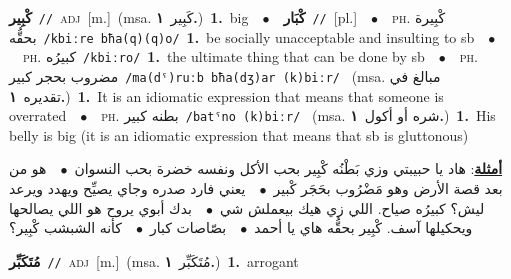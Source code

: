 \documentclass[10pt,a4paper,twoside]{article} %
\begin{document}
\begin{multicols}{2}
{\setlength\topsep{0pt}\textbf{\foreignlanguage{arabic}{كْبِير}}\ {\color{gray}\texttt{//}\color{black}}\ \textsc{adj}\ [m.]\ \color{gray}(msa. \foreignlanguage{arabic}{كَبِير}~\foreignlanguage{arabic}{\textbf{١.}})\color{black}\ \textbf{1.}~big\ \ $\bullet$\ \ \setlength\topsep{0pt}\textbf{\foreignlanguage{arabic}{كْبَار}}\ {\color{gray}\texttt{//}\color{black}}\ [pl.]\ \ $\bullet$\ \ \textsc{ph.} \color{gray} \foreignlanguage{arabic}{كْبِيرة بحقُّه}\color{black}\ {\color{gray}\texttt{/{\sffamily kbiːre bħa(q)(q)o}/}\color{black}}\ \textbf{1.}~be socially unacceptable and insulting to sb\ \ $\bullet$\ \ \textsc{ph.} \color{gray} \foreignlanguage{arabic}{كبيرُه}\color{black}\ {\color{gray}\texttt{/{\sffamily kbiːro}/}\color{black}}\ \textbf{1.}~the ultimate thing that can be done by sb\ \ $\bullet$\ \ \textsc{ph.} \color{gray} \foreignlanguage{arabic}{مضروب بحجر كبير}\color{black}\ {\color{gray}\texttt{/{\sffamily ma(dˤ)ruːb bħa(dʒ)ar (k)biːr}/}\color{black}}\ \color{gray} (msa. \foreignlanguage{arabic}{مبالغ في تقديره}~\foreignlanguage{arabic}{\textbf{١.}})\color{black}\ \textbf{1.}~It is an idiomatic expression that means that someone is overrated\ \ $\bullet$\ \ \textsc{ph.} \color{gray} \foreignlanguage{arabic}{بطنه كبير}\color{black}\ {\color{gray}\texttt{/{\sffamily batˤno (k)biːr}/}\color{black}}\ \color{gray} (msa. \foreignlanguage{arabic}{شره أو أكول}~\foreignlanguage{arabic}{\textbf{١.}})\color{black}\ \textbf{1.}~His belly is big (it is an idiomatic expression that means that sb is gluttonous)\  \begin{flushright}\color{gray}\foreignlanguage{arabic}{\textbf{\underline{\foreignlanguage{arabic}{أمثلة}}}: هاد يا حبيبتي وزي بَطْنُه كْبِير بحب الأكل ونفسه خضرة بحب النسوان\ $\bullet$\ \  هو من بعد قصة الأرض وهو مَضْرُوب بحَجَر كْبير\ $\bullet$\ \  يعني فارد صدره وجاي يصيِّح ويهدد ويرعد ليش؟ كبيرُه صياح. اللي زي هيك بيعملش شي\ $\bullet$\ \  بدك أبوي يروح هو اللي يصالحها ويحكيلها آسف. كْبِير بحقُّه هاي يا أحمد\ $\bullet$\ \  بصّاصات كبار\ $\bullet$\ \  كأنه الشبشب كْبِير؟}\end{flushright}\color{black}} \vspace{2mm}

{\setlength\topsep{0pt}\textbf{\foreignlanguage{arabic}{مُتَكَبِّر}}\ {\color{gray}\texttt{//}\color{black}}\ \textsc{adj}\ [m.]\ \color{gray}(msa. \foreignlanguage{arabic}{مُتَكَبِّر}~\foreignlanguage{arabic}{\textbf{١.}})\color{black}\ \textbf{1.}~arrogant\ } \vspace{2mm}


\end{multicols}
\end{document}
